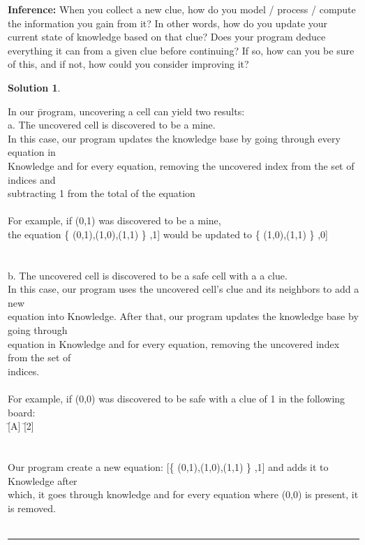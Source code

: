 \documentclass{article}
\theoremstyle{definition}
\def\fline{\rule{0.75\linewidth}{0.5pt}}
\newcommand{\finishline}{\vspace{-15pt}\begin{center}\fline\end{center}}
\newtheorem*{solution*}{Solution}
\newenvironment{solution}{\begin{solution*}}{{\finishline} \end{solution*}}
\begin{document}
\smallskip

\textbf{Inference:}
	When you collect a new clue, how do you model / process / compute the information you gain from it?
    In other words, how do you update your current state of knowledge based on that clue? 
    Does your program deduce everything it can from a given clue before continuing? If so, how can you be sure of this, and if not, how could you consider improving it? \\
\begin{solution} \hfill \\
    \begin{tabbing}
	In our \=program, uncovering a cell can yield two results: \\
	\>a. T\=he uncovered cell is discovered to be a mine.\\
	\>\>In this case, our program updates the knowledge base by going through every equation in\\ \>\>Knowledge and for every equation, removing the uncovered index from the set of indices and\\ \>\>subtracting 1 from the total of the equation\\\\
	
	\>\> For example, if (0,1) was discovered to be a mine, \\
	\>\>the equation \{ (0,1),(1,0),(1,1) \} ,1] would be updated to \{ (1,0),(1,1) \} ,0] \\\\\\
	
	\>b. The uncovered cell is discovered to be a safe cell with a a clue.\\
	\>\>In this case, our program uses the uncovered cell's clue and its neighbors to add a new\\ \>\>equation into Knowledge. After that, our program updates the knowledge base by going through\\
	\>\>equation in Knowledge and for every equation, removing the uncovered index from the set of\\
	\>\>indices.\\\\
	
	\>\>For example, if (0,0) was discovered to be safe with a clue of 1 in the following board:\\
	\>\>[1] \=[A] \=[2] \\ 
    \>\>[B] \>[C] \>[D] \\
    \>\>[E] \>[3] \>[F] \\
    \>\>Our program create a new equation: [\{ (0,1),(1,0),(1,1) \} ,1] and adds it to Knowledge after \\ \>\>which, it goes through knowledge and for every equation where (0,0) is present, it is removed.\\\\
    

\end{tabbing}
\end{solution}
\end{document}
